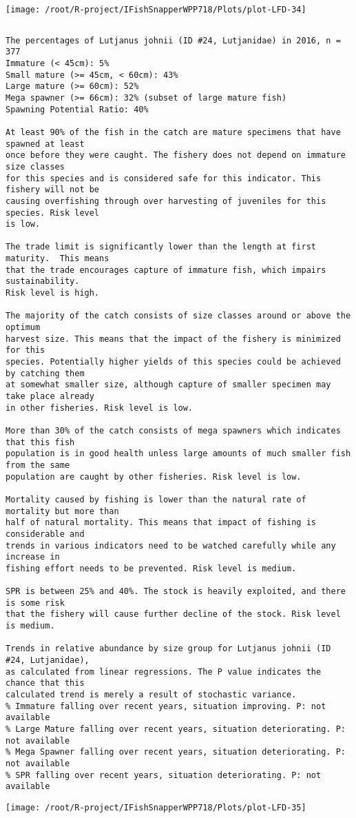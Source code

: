 \documentclass{report}\usepackage[]{graphicx}\usepackage[]{color}
\makeatletter
\def\maxwidth{ %
  \ifdim\Gin@nat@width>\linewidth
    \linewidth
  \else
    \Gin@nat@width
  \fi
}
\newenvironment{kframe}{%
 \def\at@end@of@kframe{}%
 \ifinner\ifhmode%
  \def\at@end@of@kframe{\end{minipage}}%
  \begin{minipage}{\columnwidth}%
 \fi\fi%
 \def\FrameCommand##1{\hskip\@totalleftmargin \hskip-\fboxsep
 \colorbox{shadecolor}{##1}\hskip-\fboxsep
     \hskip-\linewidth \hskip-\@totalleftmargin \hskip\columnwidth}%
 \MakeFramed {\advance\hsize-\width
   \@totalleftmargin\z@ \linewidth\hsize
   \@setminipage}}%
 {\par\unskip\endMakeFramed%
 \at@end@of@kframe}
\newenvironment{knitrout}{}{} %
\makeatother
\begin{document}
\begin{knitrout}
\texttt{[image: /root/R-project/IFishSnapperWPP718/Plots/plot-LFD-34]} 
\begin{kframe}\begin{verbatim}
\end{verbatim}
\end{kframe}
\clearpage
\newpage
\begin{kframe}\begin{verbatim}The percentages of Lutjanus johnii (ID #24, Lutjanidae) in 2016, n = 377
Immature (< 45cm): 5%
Small mature (>= 45cm, < 60cm): 43%
Large mature (>= 60cm): 52%
Mega spawner (>= 66cm): 32% (subset of large mature fish)
Spawning Potential Ratio: 40%
 
At least 90% of the fish in the catch are mature specimens that have spawned at least
once before they were caught. The fishery does not depend on immature size classes
for this species and is considered safe for this indicator. This fishery will not be
causing overfishing through over harvesting of juveniles for this species. Risk level
is low.

The trade limit is significantly lower than the length at first maturity.  This means
that the trade encourages capture of immature fish, which impairs sustainability.
Risk level is high.

The majority of the catch consists of size classes around or above the optimum
harvest size. This means that the impact of the fishery is minimized for this
species. Potentially higher yields of this species could be achieved by catching them
at somewhat smaller size, although capture of smaller specimen may take place already
in other fisheries. Risk level is low.

More than 30% of the catch consists of mega spawners which indicates that this fish
population is in good health unless large amounts of much smaller fish from the same
population are caught by other fisheries. Risk level is low.
 
Mortality caused by fishing is lower than the natural rate of mortality but more than
half of natural mortality. This means that impact of fishing is considerable and
trends in various indicators need to be watched carefully while any increase in
fishing effort needs to be prevented. Risk level is medium.
 
SPR is between 25% and 40%. The stock is heavily exploited, and there is some risk
that the fishery will cause further decline of the stock. Risk level is medium.
 
Trends in relative abundance by size group for Lutjanus johnii (ID #24, Lutjanidae),
as calculated from linear regressions. The P value indicates the chance that this
calculated trend is merely a result of stochastic variance.
% Immature falling over recent years, situation improving. P: not available
% Large Mature falling over recent years, situation deteriorating. P: not available
% Mega Spawner falling over recent years, situation deteriorating. P: not available
% SPR falling over recent years, situation deteriorating. P: not available
\end{verbatim}
\end{kframe}
\texttt{[image: /root/R-project/IFishSnapperWPP718/Plots/plot-LFD-35]} 


\end{knitrout}
\end{document}
